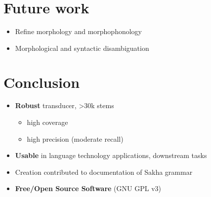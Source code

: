 \documentclass[a0paper,fleqn]{betterposter}
\begin{document}
{%
%

\section{Future work}

\vspace{-2em}
\begin{itemize}
    \item Refine morphology and morphophonology
    \item Morphological and syntactic disambiguation
\end{itemize}
\vspace{-0.5em}

\section{Conclusion}

\vspace{-2em}
\begin{itemize}
    \item \textbf{Robust} transducer, >30k stems
    \begin{itemize}
        \item high coverage
        \item high precision (moderate recall)
    \end{itemize}
    \item \textbf{Usable} in language technology applications, downstream tasks
    \item Creation contributed to documentation of Sakha grammar
    \item \textbf{Free/Open Source Software} (GNU GPL v3)
\end{itemize}

\vfill

}
\end{document}
